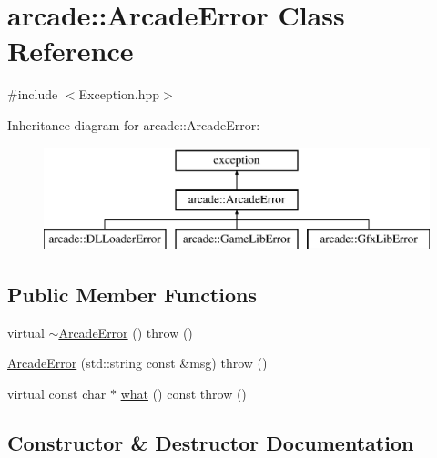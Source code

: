 \hypertarget{classarcade_1_1_arcade_error}{}\section{arcade\+:\+:Arcade\+Error Class Reference}
\label{classarcade_1_1_arcade_error}


{\ttfamily \#include $<$Exception.\+hpp$>$}

Inheritance diagram for arcade\+:\+:Arcade\+Error\+:\begin{figure}[H]
\begin{center}
\leavevmode
\includegraphics[height=3.000000cm]{classarcade_1_1_arcade_error}
\end{center}
\end{figure}
\subsection*{Public Member Functions}
\begin{DoxyCompactItemize}
\item 
virtual \hyperlink{classarcade_1_1_arcade_error_a421014734e82162258dca5ec2836d860}{$\sim$\+Arcade\+Error} ()  throw ()
\item 
\hyperlink{classarcade_1_1_arcade_error_ab8c1d2196492a10bb07177d1c5187322}{Arcade\+Error} (std\+::string const \&msg)  throw ()
\item 
virtual const char $\ast$ \hyperlink{classarcade_1_1_arcade_error_a48642ed78360efee13b4f1e343035f4e}{what} () const  throw ()
\end{DoxyCompactItemize}


\subsection{Constructor \& Destructor Documentation}
\mbox{\label{classarcade_1_1_arcade_error_a421014734e82162258dca5ec2836d860}} 
